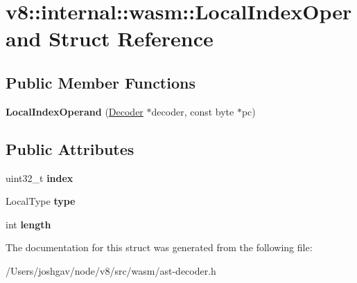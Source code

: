 \hypertarget{structv8_1_1internal_1_1wasm_1_1_local_index_operand}{}\section{v8\+:\+:internal\+:\+:wasm\+:\+:Local\+Index\+Operand Struct Reference}
\label{structv8_1_1internal_1_1wasm_1_1_local_index_operand}
\subsection*{Public Member Functions}
\begin{DoxyCompactItemize}
\item 
{\bfseries Local\+Index\+Operand} (\hyperlink{classv8_1_1internal_1_1wasm_1_1_decoder}{Decoder} $\ast$decoder, const byte $\ast$pc)\hypertarget{structv8_1_1internal_1_1wasm_1_1_local_index_operand_ab08b8b5caa131be4b0e8d2611e707bb8}{}\label{structv8_1_1internal_1_1wasm_1_1_local_index_operand_ab08b8b5caa131be4b0e8d2611e707bb8}

\end{DoxyCompactItemize}
\subsection*{Public Attributes}
\begin{DoxyCompactItemize}
\item 
uint32\+\_\+t {\bfseries index}\hypertarget{structv8_1_1internal_1_1wasm_1_1_local_index_operand_a694e5e9c15f1308457d1b4f92825af7a}{}\label{structv8_1_1internal_1_1wasm_1_1_local_index_operand_a694e5e9c15f1308457d1b4f92825af7a}

\item 
Local\+Type {\bfseries type}\hypertarget{structv8_1_1internal_1_1wasm_1_1_local_index_operand_a708d80d877abdf729cbfa4d7752b3750}{}\label{structv8_1_1internal_1_1wasm_1_1_local_index_operand_a708d80d877abdf729cbfa4d7752b3750}

\item 
int {\bfseries length}\hypertarget{structv8_1_1internal_1_1wasm_1_1_local_index_operand_a67d5c82f56c2aa18deb10bc1c231ff38}{}\label{structv8_1_1internal_1_1wasm_1_1_local_index_operand_a67d5c82f56c2aa18deb10bc1c231ff38}

\end{DoxyCompactItemize}


The documentation for this struct was generated from the following file\+:\begin{DoxyCompactItemize}
\item 
/\+Users/joshgav/node/v8/src/wasm/ast-\/decoder.\+h\end{DoxyCompactItemize}
